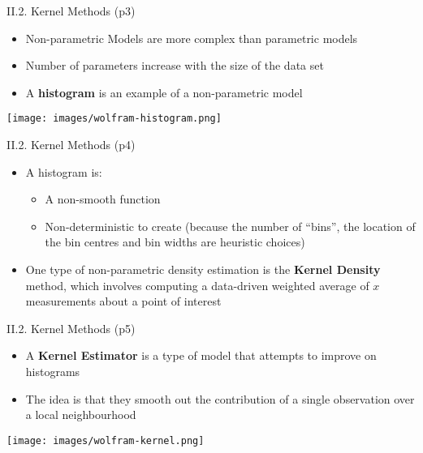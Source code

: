 \documentclass[handout]{beamer}
\newcommand{\stronger}[1]{\textbf{\color{purple} #1}}
\begin{document}
\begin{frame}{II.2. Kernel Methods (p3)} %
\begin{itemize}
\item Non-parametric Models are more complex than parametric models
\item Number of parameters increase with the size of the data set %
\item A \stronger{histogram} is an example of a non-parametric model
\end{itemize}
\begin{center}
\texttt{[image: images/wolfram-histogram.png]}
\end{center}
\end{frame}
\begin{frame}{II.2. Kernel Methods (p4)}
\begin{itemize}
\item A histogram is:
	\begin{itemize}
	\item A non-smooth function
	\item Non-deterministic to create (because the number of ``bins'', the location of the bin centres and bin widths are heuristic choices)
	\end{itemize}
\item One type of non-parametric density estimation is the \stronger{Kernel Density} method, which involves computing a data-driven weighted average of $x$ measurements about a point of interest
\end{itemize}
\end{frame}
\begin{frame}{II.2. Kernel Methods (p5)}
\begin{itemize}
\item A \stronger{Kernel Estimator} is a type of model that attempts to improve on histograms
\item The idea is that they smooth out the contribution of a single observation over a local neighbourhood
\end{itemize}
\begin{center}
\texttt{[image: images/wolfram-kernel.png]}
\end{center}
\end{frame}
\end{document}
